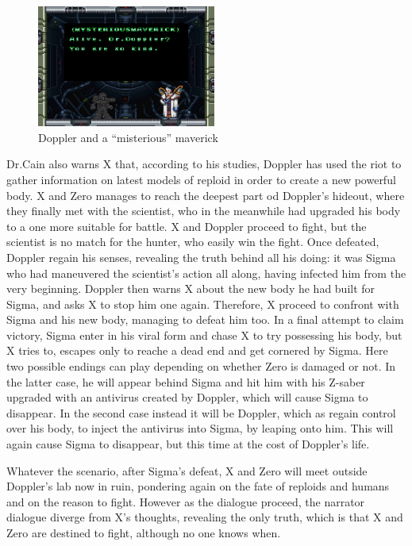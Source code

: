 \begin{figure}[htp]
	\centering
	\includegraphics[height=4cm]{figures/X3/Story_2.jpg}
	\caption{Doppler and a ``misterious'' maverick}
\end{figure} Dr.Cain also warns X that, according to his studies, Doppler has used the riot to gather information on latest models of reploid in order to create a new powerful body. X and Zero manages to reach the deepest part od Doppler's hideout, where they finally met with the scientist, who in the meanwhile had upgraded his body to a one more suitable for battle. X and Doppler proceed to fight, but the scientist is no match for the hunter, who easily win the fight. Once defeated, Doppler regain his senses, revealing the truth behind all his doing: it was Sigma who had maneuvered the scientist's action all along, having infected him from the very beginning. Doppler then warns X about the new body he had built for Sigma, and asks X to stop him one again. Therefore, X proceed to confront with Sigma and his new body, managing to defeat him too. In a final attempt to claim victory, Sigma enter in his viral form and chase X to try possessing his body, but X tries to, escapes only to reache a dead end and get cornered by Sigma. Here two possible endings can play depending on whether Zero is damaged or not. In the latter case, he will appear behind Sigma and hit him with his Z-saber upgraded with an antivirus created by Doppler, which will cause Sigma to disappear. In the second case instead it will be Doppler, which as regain control over his body, to inject the antivirus into Sigma, by leaping onto him. This will again cause Sigma to disappear, but this time at the cost of Doppler's life.

Whatever the scenario, after Sigma's defeat, X and Zero will meet outside Doppler's lab now in ruin, pondering again on the fate of reploids and humans and on the reason to fight. However as the dialogue proceed, the narrator dialogue diverge from X's thoughts, revealing the only truth, which is that X and Zero are destined to fight, although no one knows when.

